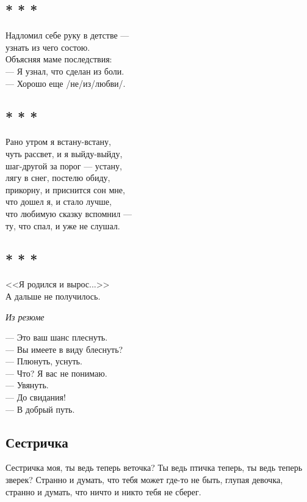 \documentclass[12pt,a5paper]{report}
\begin{document}
\subsection[<<Надломил себе руку в детстве...>>]{* * *}
Надломил себе руку в детстве ---\\
узнать из чего состою.\\
Объясняя маме последствия:\\

--- Я узнал, что сделан из боли.\\
--- Хорошо еще /не/из/любви/.
\newpage

\subsection[<<Рано утром я встану-встану...>>]{* * *}
Рано утром я встану-встану,\\
чуть рассвет, и я выйду-выйду,\\
шаг-другой за порог --- устану,\\
лягу в снег, постелю обиду,\\

прикорну, и приснится сон мне,\\
что дошел я, и стало лучше,\\
что любимую сказку вспомнил ---\\
ту, что спал, и уже не слушал.\\
\newpage

\subsection[<<Это ваш шанс плеснуть...>>]{* * *}
\epigraph{
<<Я родился и вырос...>>\\
А дальше не получилось.
}{\emph{Из резюме}}

--- Это ваш шанс плеснуть.\\
--- Вы имеете в виду блеснуть?\\
--- Плюнуть, уснуть.\\
--- Что? Я вас не понимаю.\\
--- Увянуть.\\
--- До свидания!\\
--- В добрый путь.
\newpage



\subsection{Сестричка}
Сестричка моя, ты ведь теперь веточка? Ты ведь птичка теперь, ты ведь теперь зверек? Странно и думать, что тебя может где-то не быть, глупая девочка, странно и думать, что ничто и никто тебя не сберег.
\newpage
\end{document}
